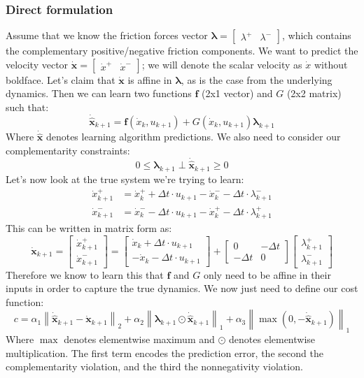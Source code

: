 \documentclass{article}
\renewcommand{\vec}[1]{\boldsymbol{#1}}
\newcommand{\rvec}[1]{\begin{bmatrix} #1 \end{bmatrix}}
\newcommand{\norm}[1]{\left\lVert#1\right\rVert}
\begin{document}
\subsubsection{Direct formulation}
Assume that we know the friction forces vector $\vec{\lambda} = \rvec{\lambda^+ & \lambda^-}$, which contains the complementary positive/negative friction components. We want to predict the velocity vector $\vec{\dot x} = \rvec{\dot x^+ & \dot x^-}$; we will denote the scalar velocity as $\dot x$ without boldface. Let's claim that $\vec{\dot x}$ is affine in $\vec{\lambda}$, as is the case from the underlying dynamics. Then we can learn two functions $\vec{f}$ (2x1 vector) and $G$ (2x2 matrix) such that:
\[
    \vec{\dot{\hat x}}_{k+1} = \vec{f}(\dot x_k, u_{k+1}) + G(\dot x_k, u_{k+1}) \vec{\lambda}_{k+1}
\]
Where $\vec{\dot{\hat x}}$ denotes learning algorithm predictions. We also need to consider our complementarity constraints:
\[
    0 \leq \vec{\lambda}_{k+1} \perp \vec{\dot{\hat x}}_{k+1} \geq 0
\]
Let's now look at the true system we're trying to learn:
\begin{align*}
    \dot x^+_{k+1} &= \dot x^+_k + \Delta t \cdot u_{k+1} - \dot x^-_{k} - \Delta t \cdot \lambda^-_{k+1} \\
    \dot x^-_{k+1} &= \dot x^-_k - \Delta t \cdot u_{k+1} - \dot x^+_{k} - \Delta t \cdot \lambda^+_{k+1}
\end{align*}
This can be written in matrix form as:
\[
    \vec{\dot x}_{k+1} = \begin{bmatrix} \dot x^+_{k+1} \\ \dot x^-_{k+1} \end{bmatrix}
    =
    \begin{bmatrix}
        \dot x_k + \Delta t \cdot u_{k+1} \\
       -\dot x_k - \Delta t \cdot u_{k+1}
    \end{bmatrix}
    +
    \begin{bmatrix}
        0 & -\Delta t \\
        -\Delta t & 0
    \end{bmatrix}
    \begin{bmatrix}
        \lambda^+_{k+1} \\
        \lambda^-_{k+1}
    \end{bmatrix}
\]
Therefore we know to learn this that $\vec{f}$ and $G$ only need to be affine in their inputs in order to capture the true dynamics. We now just need to define our cost function:
\[
    c = \alpha_1 \norm{\vec{\dot{\hat x}}_{k+1} - \vec{\dot x}_{k+1}}_2 + \alpha_2 \norm{\vec{\lambda}_{k+1} \odot \vec{\dot{\hat x}}_{k+1}}_1 + \alpha_3 \norm{\max \left(0, -\vec{\dot{\hat x}}_{k+1}\right)}_1
\] 
Where $\max$ denotes elementwise maximum and $\odot$ denotes elementwise multiplication. The first term encodes the prediction error, the second the complementarity violation, and the third the nonnegativity violation.
\end{document}
